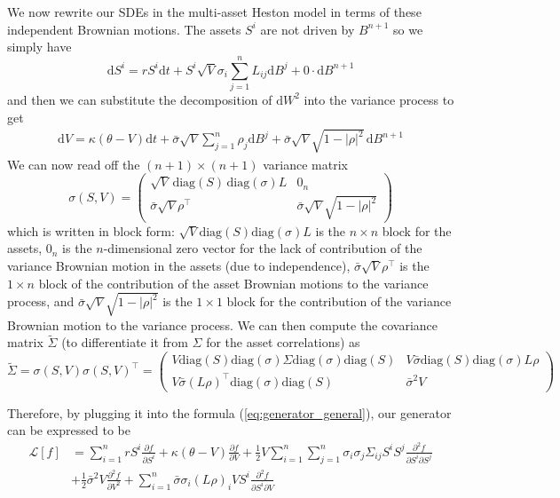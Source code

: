We now rewrite our SDEs in the multi-asset Heston model in terms of these independent Brownian motions. The assets $S^i$ are not driven by $B^{n+1}$ so we simply have
\begin{equation}
    \mathrm d S^i = rS^i \mathrm dt + S^i \sqrt V \sigma_i \sum_{j=1}^n L_{ij} \mathrm d B^j + 0 \cdot \mathrm d B^{n+1}
\end{equation}
and then we can substitute the decomposition of $\mathrm dW^2$ into the variance process to get
\begin{align}
    \mathrm dV = \kappa(\theta - V) \mathrm dt + \bar \sigma \sqrt V \sum_{j=1}^n \rho_j \mathrm d B^j + \bar\sigma \sqrt V \sqrt{1 - |\rho|^2}\,\mathrm d B^{n+1}
\end{align}
We can now read off the $(n+1) \times (n+1)$ variance matrix
\begin{equation}
    \sigma(S, V) = \begin{pmatrix}
        \sqrt V \,\text{diag}(S) \,\text{diag}(\sigma) L & 0_n \\
        \bar \sigma \sqrt V \rho^\top & \bar\sigma \sqrt V \sqrt{1 - |\rho|^2}
    \end{pmatrix}
\end{equation}
which is written in block form: $\sqrt V \text{diag}(S)\text{diag}(\sigma)L$ is the $n\times n$ block for the assets, $0_n$ is the $n$-dimensional zero vector for the lack of contribution of the variance Brownian motion in the assets (due to independence), $\bar\sigma \sqrt V \rho^\top$ is the $1\times n$ block of the contribution of the asset Brownian motions to the variance process, and $\bar\sigma \sqrt V \sqrt{1 - |\rho|^2}$ is the $1\times 1$ block for the contribution of the variance Brownian motion to the variance process. We can then compute the covariance matrix $\tilde \Sigma$ (to differentiate it from $\Sigma$ for the asset correlations) as
\begin{equation}
    \tilde \Sigma = \sigma(S, V)\sigma(S, V)^\top = \begin{pmatrix}
        V \text{diag}(S) \text{diag}(\sigma) \Sigma \text{diag}(\sigma) \text{diag}(S) & V\bar\sigma \text{diag}(S) \text{diag}(\sigma) L \rho \\
        V\bar\sigma (L\rho)^\top \text{diag}(\sigma) \text{diag}(S) & \bar\sigma^2 V
    \end{pmatrix}
\end{equation}

Therefore, by plugging it into the formula (\ref{eq:generator_general}), our generator can be expressed to be
\begin{equation}
    \begin{aligned}
        \mathcal L[f] &=
            \sum_{i=1}^n rS^i \frac{\partial f}{\partial S^i}
            + \kappa(\theta - V)\frac{\partial f}{\partial V}
            + \frac 12 V \sum_{i=1}^n\sum_{j=1}^n \sigma_i \sigma_j \Sigma_{ij} S^i S^j \frac{\partial^2f}{\partial S^i\partial S^j} \\
            &+ \frac 12 \bar\sigma^2 V \frac{\partial^2f}{\partial V^2}
            + \sum_{i=1}^n \bar\sigma \sigma_i (L \rho)_i V S^i \frac{\partial^2f}{\partial S^i\partial V}
    \end{aligned}
\end{equation}


